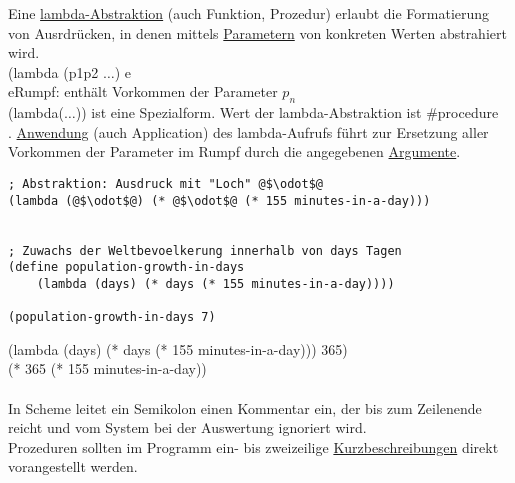 Eine \underline{lambda-Abstraktion} (auch Funktion, Prozedur) erlaubt die Formatierung von Ausrdr\"ucken, in denen mittels \underline{Parametern} von konkreten Werten abstrahiert wird.\\
(lambda (\auf p1\zu \auf p2 \zu $\ldots$) \auf e\zu\\
\auf e\zu Rumpf: enth\"alt Vorkommen der Parameter \auf $p_n$\zu\\
(lambda($\ldots$)) ist eine Spezialform. Wert der lambda-Abstraktion ist \#\auf procedure\zu\\.
\underline{Anwendung} (auch Application) des lambda-Aufrufs f\"uhrt zur Ersetzung aller Vorkommen der Parameter im Rumpf durch die angegebenen \underline{Argumente}.\\
\begin{lstlisting}[frame = single]
; Abstraktion: Ausdruck mit "Loch" @$\odot$@
(lambda (@$\odot$@) (* @$\odot$@ (* 155 minutes-in-a-day)))


; Zuwachs der Weltbevoelkerung innerhalb von days Tagen
(define population-growth-in-days
    (lambda (days) (* days (* 155 minutes-in-a-day))))

(population-growth-in-days 7)
\end{lstlisting}
(lambda (days) (* days (* 155 minutes-in-a-day))) 365) \eval\\
 (* 365 (* 155 minutes-in-a-day)) \\
\bigskip\\
In Scheme leitet ein Semikolon einen Kommentar ein, der bis zum Zeilenende reicht und vom System bei der Auswertung ignoriert wird.\\
Prozeduren sollten im Programm ein- bis zweizeilige \underline{Kurzbeschreibungen} direkt vorangestellt werden.



